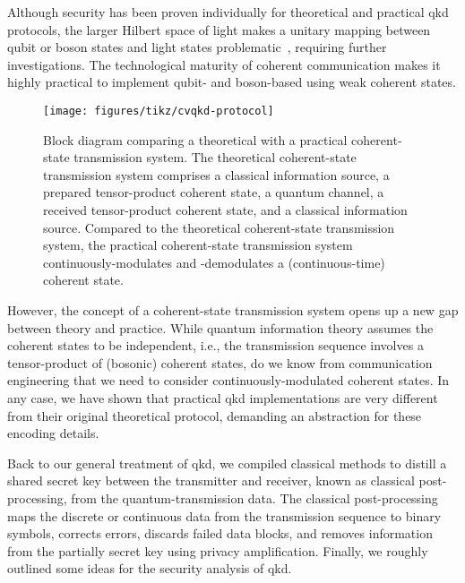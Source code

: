 Although security has been proven individually for theoretical and practical \gls{qkd} protocols, the larger Hilbert space of light makes a unitary mapping between qubit or boson states and light states problematic~\cite{Chefles2000}, requiring further investigations.
The technological maturity of coherent communication makes it highly practical to implement qubit- and boson-based using weak coherent states.
\begin{figure}[htb]
	\centering
	\texttt{[image: figures/tikz/cvqkd-protocol]}
	\caption{Block diagram comparing a theoretical with a practical coherent-state transmission system. The theoretical coherent-state transmission system comprises a classical information source, a prepared tensor-product coherent state, a quantum channel, a received tensor-product coherent state, and a classical information source. Compared to the theoretical coherent-state transmission system, the practical coherent-state transmission system continuously-modulates and -demodulates a (continuous-time) coherent state.}\label{fig:cvqkd_protocol}
\end{figure}
However, the concept of a coherent-state transmission system opens up a new gap between theory and practice.
While quantum information theory assumes the coherent states to be independent, i.e., the transmission sequence involves a tensor-product of (bosonic) coherent states, do we know from communication engineering that we need to consider continuously-modulated coherent states.
In any case, we have shown that practical \gls{qkd} implementations are very different from their original theoretical protocol, demanding an abstraction for these encoding details.

Back to our general treatment of \gls{qkd}, we compiled classical methods to distill a shared secret key between the transmitter and receiver, known as classical post-processing, from the quantum-transmission data.
The classical post-processing maps the discrete or continuous data from the transmission sequence to binary symbols, corrects errors, discards failed data blocks, and removes information from the partially secret key using privacy amplification.
Finally, we roughly outlined some ideas for the security analysis of \gls{qkd}.